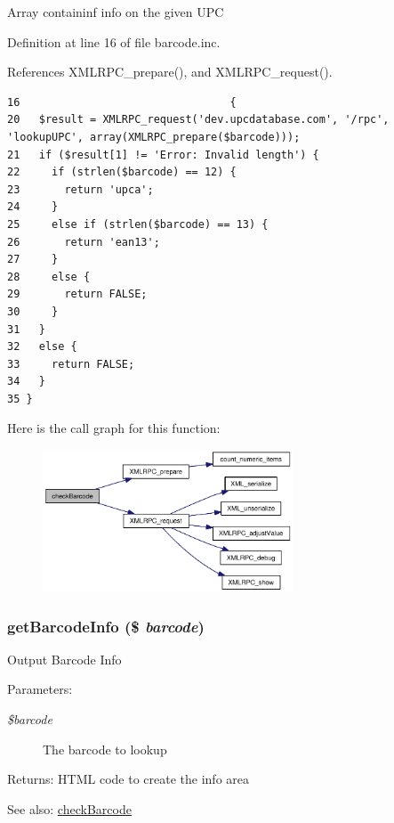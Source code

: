 Array containinf info on the given UPC 

Definition at line 16 of file barcode.inc.

References XMLRPC\_\-prepare(), and XMLRPC\_\-request().

\begin{Code}\begin{verbatim}16                                 {
20   $result = XMLRPC_request('dev.upcdatabase.com', '/rpc', 'lookupUPC', array(XMLRPC_prepare($barcode)));
21   if ($result[1] != 'Error: Invalid length') {
22     if (strlen($barcode) == 12) {
23       return 'upca';
24     }
25     else if (strlen($barcode) == 13) {
26       return 'ean13';
27     }
28     else {
29       return FALSE;
30     }
31   }
32   else {
33     return FALSE;
34   }
35 }
\end{verbatim}
\end{Code}




Here is the call graph for this function:\nopagebreak
\begin{figure}[H]
\begin{center}
\leavevmode
\includegraphics[width=211pt]{barcode_8inc_6d3645af0ef526e4f64d28dcbdceb74f_cgraph}
\end{center}
\end{figure}
\hypertarget{barcode_8inc_e10c37e4f9f9b7c6617a388351a27c99}{
\subsubsection{\setlength{\rightskip}{0pt plus 5cm}getBarcodeInfo (\$ {\em barcode})}}
\label{barcode_8inc_e10c37e4f9f9b7c6617a388351a27c99}


Output Barcode Info \begin{Desc}
\item[Parameters:]
\begin{description}
\item[{\em \$barcode}]The barcode to lookup \end{description}
\end{Desc}
\begin{Desc}
\item[Returns:]HTML code to create the info area \end{Desc}
\begin{Desc}
\item[See also:]\hyperlink{barcode_8inc_6d3645af0ef526e4f64d28dcbdceb74f}{checkBarcode} \end{Desc}


